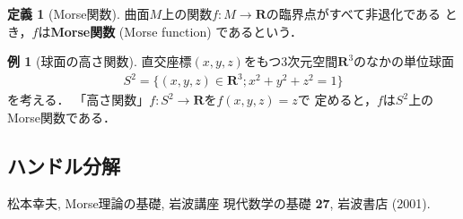 \documentclass[11pt, a4paper, dvipdfmx]{jsarticle}
\theoremstyle{definition}
\newcommand{\rr}{\mathbf{R}}
\theoremstyle{mystyle}
\newtheorem{DFN}[Axiom]{定義}
\newtheorem{EG}[Axiom]{例}
\numberwithin{equation}{section} %
\begin{document}
\begin{DFN}[Morse関数]
    曲面$M$上の関数$f\colon M\to \rr$の臨界点がすべて非退化である
    とき，$f$は\textbf{Morse関数} (Morse function) であるという．
\end{DFN}

\begin{EG}[球面の高さ関数]
    直交座標$(x,y,z)$をもつ3次元空間$\rr^3$のなかの単位球面
    \begin{align}
        S^2=\{(x,y,z)\in\rr^3; x^2+y^2+z^2=1\}
    \end{align}
    を考える．
    「高さ関数」$f\colon S^2\to\rr$を$f(x,y,z)=z$で
    定めると，$f$は$S^2$上のMorse関数である．
\end{EG}
\subsection{ハンドル分解}






\begin{thebibliography}{15}

 松本幸夫, Morse理論の基礎, 岩波講座 現代数学の基礎 {\bf 27}, 岩波書店 (2001).

\end{thebibliography}
\end{document}
